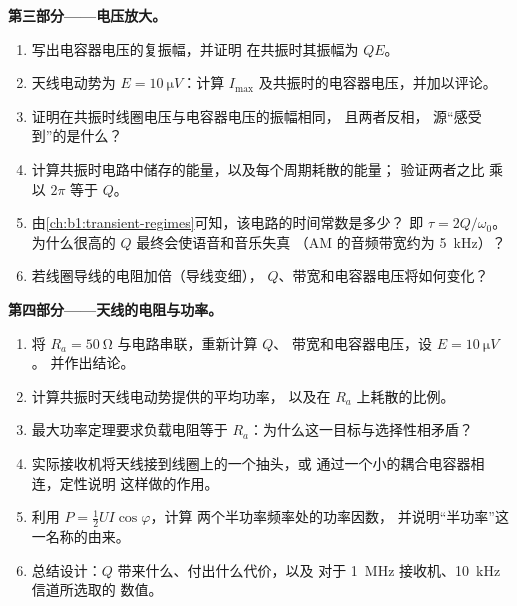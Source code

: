 \begin{problem}
\medskip
\noindent\textbf{第三部分——电压放大。}
\begin{enumerate}[resume]
  \item 写出电容器电压的复振幅，并证明
        在共振时其振幅为 $QE$。
  \item 天线电动势为 $E = \qty{10}{\micro V}$：计算 $I_{\max}$
        及共振时的电容器电压，并加以评论。
  \item 证明在共振时线圈电压与电容器电压的振幅相同，
        且两者反相，
        源“感受到”的是什么？
  \item 计算共振时电路中储存的能量，以及每个周期耗散的能量；
        验证两者之比
        乘以 $2\pi$ 等于 $Q$。
  \item 由\cref{ch:b1:transient-regimes}可知，该电路的时间常数是多少？
        即 $\tau = 2Q/\omega_0$。为什么很高的 $Q$ 最终会使语音和音乐失真
        （AM 的音频带宽约为
        \qty{5}{kHz}）？
  \item 若线圈导线的电阻加倍（导线变细），
        $Q$、带宽和电容器电压将如何变化？
\end{enumerate}

\medskip
\noindent\textbf{第四部分——天线的电阻与功率。}
\begin{enumerate}[resume]
  \item 将 $R_a = \qty{50}{\ohm}$ 与电路串联，重新计算 $Q$、
        带宽和电容器电压，设 $E = \qty{10}{\micro V}$。
        并作出结论。
  \item 计算共振时天线电动势提供的平均功率，
        以及在 $R_a$ 上耗散的比例。
  \item 最大功率定理要求负载电阻等于
        $R_a$：为什么这一目标与选择性相矛盾？
  \item 实际接收机将天线接到线圈上的一个抽头，或
        通过一个小的耦合电容器相连，定性说明
        这样做的作用。
  \item 利用 $P = \tfrac12 UI\cos\varphi$，计算
        两个半功率频率处的功率因数，
        并说明“半功率”这一名称的由来。
  \item 总结设计：$Q$ 带来什么、付出什么代价，以及
        对于 \qty{1}{MHz} 接收机、\qty{10}{kHz} 信道所选取的
        数值。
\end{enumerate}
\end{problem}
